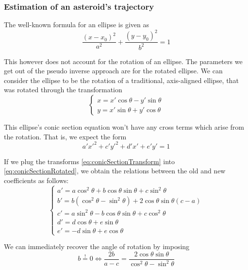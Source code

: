 \subsubsection{Estimation of an asteroid's trajectory}

The well-known formula for an ellipse is given as
\begin{equation}
    \frac{(x - x_0)^2}{a^2} + \frac{(y - y_0)^2}{b^2} = 1
    \label{eq:ellipse}
\end{equation}

This however does not account for the rotation of an ellipse. The parameters we get out of the pseudo inverse approach are for the rotated ellipse. We can consider the ellipse to be the rotation of a traditional, axis-aligned ellipse, that was rotated through the transformation
\begin{equation}
    \begin{cases}
        x = x'\cos\theta - y'\sin\theta \\
        y = x'\sin\theta + y'\cos\theta
    \end{cases}
    \label{eq:conicSectionTransform}
\end{equation}

This ellipse's conic section equation won't have any cross terms which arise from the rotation. That is, we expect the form
\begin{equation}
    a'x'^2 + c'y'^2 + d'x' + e'y' = 1
    \label{eq:conicSectionUnrotated}
\end{equation}

If we plug the transforms \autoref{eq:conicSectionTransform} into \autoref{eq:conicSectionRotated}, we obtain the relations between the old and new coefficients as follows:
\begin{equation}
    \begin{cases}
        a' = a \cos^2\theta + b \cos\theta\sin\theta + c\sin^2\theta \\
        b' = b (\cos^2\theta - \sin^2\theta) + 2\cos\theta\sin\theta (c-a) \\
        c' = a \sin^2\theta - b \cos\theta\sin\theta + c\cos^2\theta \\
        d' = d\cos\theta + e\sin\theta \\
        e' = -d\sin\theta + e\cos\theta 
    \end{cases}
\end{equation}

We can immediately recover the angle of rotation by imposing
\begin{equation}
    b \overset{!}{=} 0 \Leftrightarrow \frac{2b}{a - c} = \frac{2\cos\theta\sin\theta}{\cos^2\theta - \sin^2\theta}
\end{equation}

